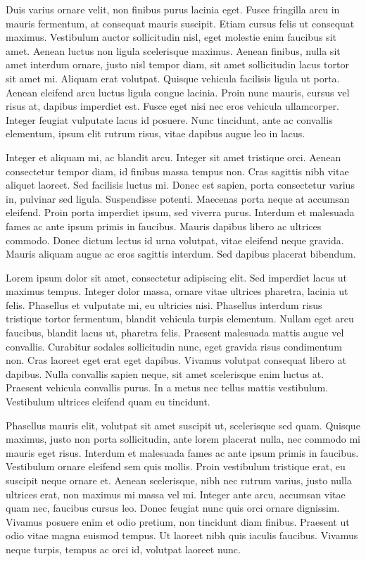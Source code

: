 \documentclass[
  12pt,
  a4paper,
  oneside]{book}
\begin{document}
Duis varius ornare velit, non finibus purus lacinia eget. Fusce fringilla arcu in mauris fermentum, at consequat mauris suscipit. Etiam cursus felis ut consequat maximus. Vestibulum auctor sollicitudin nisl, eget molestie enim faucibus sit amet. Aenean luctus non ligula scelerisque maximus. Aenean finibus, nulla sit amet interdum ornare, justo nisl tempor diam, sit amet sollicitudin lacus tortor sit amet mi. Aliquam erat volutpat. Quisque vehicula facilisis ligula ut porta. Aenean eleifend arcu luctus ligula congue lacinia. Proin nunc mauris, cursus vel risus at, dapibus imperdiet est. Fusce eget nisi nec eros vehicula ullamcorper. Integer feugiat vulputate lacus id posuere. Nunc tincidunt, ante ac convallis elementum, ipsum elit rutrum risus, vitae dapibus augue leo in lacus.

Integer et aliquam mi, ac blandit arcu. Integer sit amet tristique orci. Aenean consectetur tempor diam, id finibus massa tempus non. Cras sagittis nibh vitae aliquet laoreet. Sed facilisis luctus mi. Donec est sapien, porta consectetur varius in, pulvinar sed ligula. Suspendisse potenti. Maecenas porta neque at accumsan eleifend. Proin porta imperdiet ipsum, sed viverra purus. Interdum et malesuada fames ac ante ipsum primis in faucibus. Mauris dapibus libero ac ultrices commodo. Donec dictum lectus id urna volutpat, vitae eleifend neque gravida. Mauris aliquam augue ac eros sagittis interdum. Sed dapibus placerat bibendum.

Lorem ipsum dolor sit amet, consectetur adipiscing elit. Sed imperdiet lacus ut maximus tempus. Integer dolor massa, ornare vitae ultrices pharetra, lacinia ut felis. Phasellus et vulputate mi, eu ultricies nisi. Phasellus interdum risus tristique tortor fermentum, blandit vehicula turpis elementum. Nullam eget arcu faucibus, blandit lacus ut, pharetra felis. Praesent malesuada mattis augue vel convallis. Curabitur sodales sollicitudin nunc, eget gravida risus condimentum non. Cras laoreet eget erat eget dapibus. Vivamus volutpat consequat libero at dapibus. Nulla convallis sapien neque, sit amet scelerisque enim luctus at. Praesent vehicula convallis purus. In a metus nec tellus mattis vestibulum. Vestibulum ultrices eleifend quam eu tincidunt.

Phasellus mauris elit, volutpat sit amet suscipit ut, scelerisque sed quam. Quisque maximus, justo non porta sollicitudin, ante lorem placerat nulla, nec commodo mi mauris eget risus. Interdum et malesuada fames ac ante ipsum primis in faucibus. Vestibulum ornare eleifend sem quis mollis. Proin vestibulum tristique erat, eu suscipit neque ornare et. Aenean scelerisque, nibh nec rutrum varius, justo nulla ultrices erat, non maximus mi massa vel mi. Integer ante arcu, accumsan vitae quam nec, faucibus cursus leo. Donec feugiat nunc quis orci ornare dignissim. Vivamus posuere enim et odio pretium, non tincidunt diam finibus. Praesent ut odio vitae magna euismod tempus. Ut laoreet nibh quis iaculis faucibus. Vivamus neque turpis, tempus ac orci id, volutpat laoreet nunc.
\end{document}
